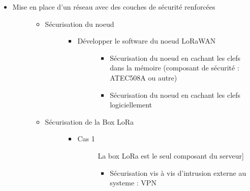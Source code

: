 \documentclass[letterpaper,10pt,french]{sphinxmanual}
\begin{document}
\begin{itemize}
\begin{description}
\begin{itemize}
\begin{description}
\begin{itemize}
\end{itemize}

\end{description}

\end{itemize}

\end{description}

\item {} \begin{description}
\item[{Mise en place d’un réseau avec des couches de sécurité renforcées}] \leavevmode\begin{itemize}
\item {} \begin{description}
\item[{Sécurisation du noeud}] \leavevmode\begin{itemize}
\item {} \begin{description}
\item[{Développer le software du noeud LoRaWAN}] \leavevmode\begin{itemize}
\item {} 
Sécurisation du noeud en cachant les clefs dans la mémoire (composant de sécurité : ATEC508A ou autre)

\item {} 
Sécurisation du noeud en cachant les clefs logiciellement

\end{itemize}

\end{description}

\end{itemize}

\end{description}

\item {} \begin{description}
\item[{Sécurisation de la Box LoRa}] \leavevmode\begin{itemize}
\item {} \begin{description}
\item[{Cas 1}] \leavevmode{[}La box LoRa est le seul composant du serveur{]}\begin{itemize}
\item {} 
Sécurisation vis à vis d’intrusion externe au systeme : VPN


\end{itemize}
\end{description}
\end{itemize}
\end{description}
\end{itemize}
\end{description}
\end{itemize}
\end{document}
